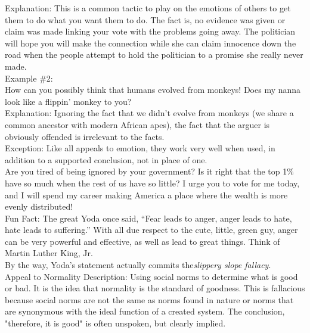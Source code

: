 \documentclass[a4paper,12pt,single,pdftex]{scrartcl}
\begin{document}
    
      Explanation: This is a common tactic to play on the emotions of others to get them to do what you want them to do.  The fact is, no evidence was given or claim was made linking your vote with the problems going away.  The politician will hope you will make the connection while she can claim innocence down the road when the people attempt to hold the politician to a promise she really never made.
    \\

    
      Example \#2:
    \\

    
      How can you possibly think that humans evolved from monkeys!  Does my nanna look like a flippin' monkey to you?
    \\

    
      Explanation: Ignoring the fact that we didn’t evolve from monkeys (we share a common ancestor with modern African apes), the fact that the arguer is obviously offended is irrelevant to the facts.
    \\

    
      Exception: Like all appeals to emotion, they work very well when used, in addition to a supported conclusion, not in place of one.
    \\

    
      Are you tired of being ignored by your government?  Is it right that the top 1\% have so much when the rest of us have so little?  I urge you to vote for me today, and I will spend my career making America a place where the wealth is more evenly distributed!
    \\

    
      Fun Fact: The great Yoda once said, “Fear leads to anger, anger leads to hate, hate leads to suffering.” With all due respect to the cute, little, green guy, anger can be very powerful and effective, as well as lead to great things.  Think of Martin Luther King, Jr.
    \\

    
      By the way, Yoda’s statement actually commits the{\it  slippery slope  fallacy}.
    \\

  

Appeal to Normality
    Description: Using social norms to determine what is good or bad.  It is the idea that normality is the standard of goodness.  This is fallacious because social norms are not the same as norms found in nature or norms that are synonymous with the ideal function of a created system.  The conclusion, "therefore, it is good" is often unspoken, but clearly implied.
\end{document}
